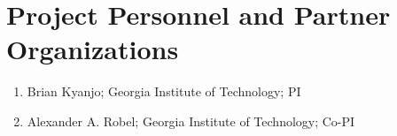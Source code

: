 \section*{Project Personnel and Partner Organizations}

\begin{enumerate}[leftmargin=*]
  \item Brian Kyanjo; Georgia Institute of Technology; PI
  \item Alexander A. Robel; Georgia Institute of Technology; Co-PI
\end{enumerate}

